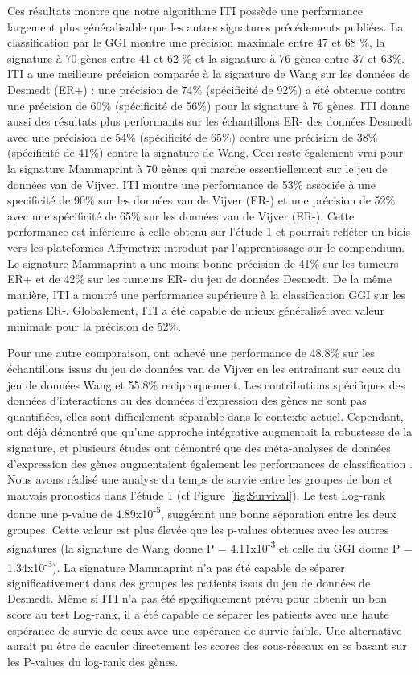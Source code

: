 		Ces résultats montre que notre algorithme ITI possède une performance largement plus généralisable que les autres signatures précédements publiées.
		La classification par le GGI montre une précision maximale entre 47 et 68 \%, la signature à 70 gènes entre 41 et 62 \% et la signature à 76 gènes entre 37 et 63\%.
		ITI a une meilleure précision comparée à la signature de Wang sur les données de Desmedt (ER+) : une précision de 74\% (spécificité de 92\%) a été obtenue contre une précision de 60\% (spécificité de 56\%) pour la signature à 76 gènes.
		ITI donne aussi des résultats plus performants sur les échantillons ER- des données Desmedt avec une précision de 54\% (spécificité de 65\%) contre une précision de 38\% (spécificité de 41\%) contre la signature de Wang.
		Ceci reste également vrai pour la signature Mammaprint à 70 gènes qui marche essentiellement sur le jeu de données van de Vijver.
		ITI montre une performance de 53\% associée à une specificité de 90\% sur les données van de Vijver (ER-) et une précision de 52\% avec une spécificité de 65\% sur les données van de Vijver (ER-). 
		Cette performance est inférieure à celle obtenu sur l'étude 1 et pourrait refléter un biais vers les plateformes Affymetrix introduit par l'apprentissage sur le compendium. 
		Le signature Mammaprint a une moins bonne précision de 41\% sur les tumeurs ER+ et de 42\% sur les tumeurs ER- du jeu de données Desmedt.
		De la même manière, ITI a montré une performance supérieure à la classification GGI sur les patiens ER-.
		Globalement, ITI a été capable de mieux généralisé avec valeur minimale pour la précision de 52\%.

		Pour une autre comparaison, \citet{Chuang2007} ont achevé une performance de 48.8\% sur les échantillons issus du jeu de données van de Vijver en les entrainant sur ceux du jeu de données Wang et 55.8\% reciproquement.
		Les contributions spécifiques des données d'interactions ou des données d'expression des gènes ne sont pas quantifiées, elles sont difficilement séparable dans le contexte actuel.
		Cependant, \citet{Chuang2007} ont déjà démontré que qu'une approche intégrative augmentait la robustesse de la signature, et plusieurs études ont démontré que des méta-analyses de données d'expression des gènes augmentaient également les performances de classification \citep{Fishel2007,Xu2005}.
		Nous avons réalisé une analyse du temps de survie entre les groupes de bon et mauvais pronostics dans l'étude 1 (cf Figure~\ref{fig:Survival}).
		Le test Log-rank donne une p-value de 4.89x10\textsuperscript{-5}, suggérant une bonne séparation entre les deux groupes.
		Cette valeur est plus élevée que les p-values obtenues avec les autres signatures (la signature de Wang donne P = 4.11x10\textsuperscript{-3} et celle du GGI donne P = 1.34x10\textsuperscript{-3}).
		La signature Mammaprint n'a pas été capable de séparer significativement dans des groupes les patients issus du jeu de données de Desmedt.
		Même si ITI n'a pas été spęcifiquement prévu pour obtenir un bon score au test Log-rank, il a été capable de séparer les patients avec une haute espérance de survie de ceux avec une espérance de survie faible.
		Une alternative aurait pu être de caculer directement les scores des sous-réseaux en se basant sur les P-values du log-rank des gènes.

